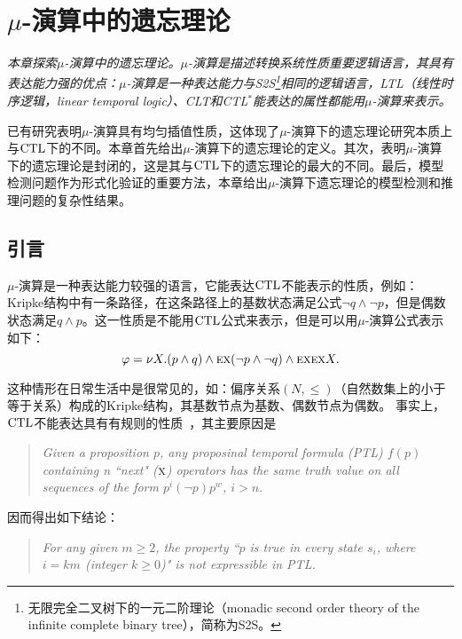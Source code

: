 \chapter{$\mu$-演算中的遗忘理论}
\label{chapter06}

{\em 本章探索$\mu$-演算中的遗忘理论。$\mu$-演算是描述转换系统性质重要逻辑语言，其具有表达能力强的优点：$\mu$-演算是一种表达能力与S2S\footnote{无限完全二叉树下的一元二阶理论（monadic second order theory of the infinite complete binary tree），简称为S2S。}相同的逻辑语言，LTL（线性时序逻辑，linear temporal logic）、CLT和CTL$^*$能表达的属性都能用$\mu$-演算来表示。
	
	已有研究表明$\mu$-演算具有均匀插值性质，这体现了$\mu$-演算下的遗忘理论研究本质上与$\textrm{CTL}$下的不同。本章首先给出$\mu$-演算下的遗忘理论的定义。其次，表明$\mu$-演算下的遗忘理论是封闭的，这是其与$\textrm{CTL}$下的遗忘理论的最大的不同。最后，模型检测问题作为形式化验证的重要方法，本章给出$\mu$-演算下遗忘理论的模型检测和推理问题的复杂性结果。
	}

\section{引言}
$\mu$-演算是一种表达能力较强的语言，它能表达$\textrm{CTL}$不能表示的性质，例如：Kripke结构中有一条路径，在这条路径上的基数状态满足公式$\neg q \wedge \neg p$，但是偶数状态满足$q \wedge p$。这一性质是不能用$\textrm{CTL}$公式来表示，但是可以用$\mu$-演算公式表示如下：
$$\varphi = \nu X.(p \wedge q) \wedge \textsc{e} \textsc{x}(\neg p \wedge \neg q) \wedge \textsc{e} \textsc{x} \textsc{e} \textsc{x} X.$$

这种情形在日常生活中是很常见的，如：偏序关系$(N, \leq)$（自然数集上的小于等于关系）构成的Kripke结构，其基数节点为基数、偶数节点为偶数。
事实上，$\textrm{CTL}$不能表达具有有规则的性质~\cite{DBLP:journals/iandc/Wolper83}，其主要原因是
\begin{quote}
	\emph{Given a proposition $p$, any proposinal temporal formula (PTL) $f(p)$ containing 
	n ``next" ($\textsc{x}$) operators has the same truth value on all sequences of the form 
	$p^i(\neg p) p^w$, $i > n$.}
\end{quote}

因而得出如下结论：
\begin{quote}
	\emph{For any given $m\geq 2$, the property ``$p$ is true in every 
	state $s_i$, where $i = km$ (integer $k\geq 0$)" is not expressible in PTL.}
\end{quote}



